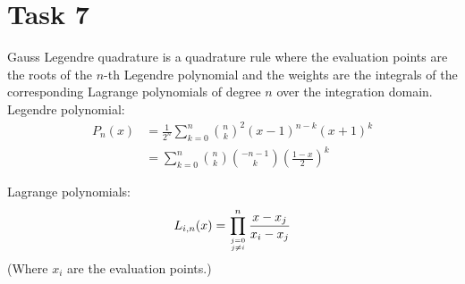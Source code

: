 \documentclass[a4paper,10pt]{article}
\title{}
\author{}
\begin{document}
\section*{Task 7}

\noindent Gauss Legendre quadrature is a quadrature rule where the evaluation points are the roots of the
$n$-th Legendre polynomial and the weights are the integrals of the corresponding Lagrange polynomials of degree $n$ over the integration domain.\\

\noindent Legendre polynomial:
\begin{align*}
 P_n(x)&=\frac{1}{2^n}\sum_{k=0}^n {n \choose k}^2 (x-1)^{n-k}(x+1)^k \\
 &= \sum_{k=0}^n {n \choose k}{-n-1 \choose k}\left(\frac{1-x}{2}\right)^k
\end{align*}

\noindent Lagrange polynomials:
\begin{align*}
 L_{i,n}(x)=\prod_{j=0 \atop j\neq i}^n \frac{x-x_j}{x_i-x_j}
\end{align*}
(Where $x_i$ are the evaluation points.)

\end{document}
